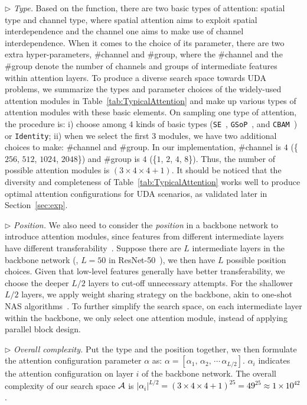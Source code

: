 \documentclass[10pt,twocolumn,letterpaper]{article}
\begin{document}
$\triangleright$ \textit{Type.}
Based on the function, there are two basic types of attention: spatial type and channel type, where spatial attention aims to exploit spatial interdependence and the channel one aims to make use of channel interdependence. When it comes to the choice of its parameter, there are two extra hyper-parameters, \#channel and \#group, where the \#channel and the \#group denote the number of channels and groups of intermediate features within attention layers. To produce a diverse search space towards UDA problems, we summarize the types and parameter choices of the widely-used attention modules in Table~\ref{tab:TypicalAttention} and make up various types of attention modules with these basic elements. On sampling one type of attention, the procedure is: i) choose among $4$ kinds of basic types (\texttt{SE}~\cite{hu2018SENet}, \texttt{GSoP}~\cite{gao2019GSoP}, and \texttt{CBAM}~\cite{woo2018cbam}) or \texttt{Identity}; ii) when we select the first $3$ modules, we have two additional choices to make: \#channel and \#group. In our implementation, \#channel is $4$ (\{$256$, $512$, $1024$, $2048$\}) and \#group is $4$ (\{$1$, $2$, $4$, $8$\}).
Thus, the number of possible attention modules is $(3 \times 4 \times 4 + 1)$.
It should be noticed that the diversity and completeness of Table~\ref{tab:TypicalAttention} works well to produce optimal attention configurations for UDA scenarios, as validated later in Section~\ref{sec:exp}.



$\triangleright$ \textit{Position.}
We also need to consider the \emph{position} in a backbone network to introduce attention modules, since features from different intermediate layers have different transferability~\cite{yosinski2014transferable}. Suppose there are $L$ intermediate layers in the backbone network (\eg, $L = 50$ in ResNet-50~\cite{he2016resnet}), we then have $L$ possible position choices.
Given that low-level features generally have better transferability, we choose the deeper $L / 2$ layers to cut-off unnecessary attempts. For the shallower $L / 2$ layers, we apply weight sharing strategy on the backbone, akin to one-shot NAS algorithms~\cite{bender2018oneshotNAS,guo2020SPOS}.
To further simplify the search space, on each intermediate layer within the backbone, we only select one attention module, instead of applying parallel block design.

$\triangleright$ \textit{Overall complexity.}
Put the type and the position together, we then formulate the attention configuration parameter $\alpha$ as: $\alpha = [ \alpha_{1}, \, \alpha_{2}, \, \cdots \, \alpha_{L/2} ]$. $\alpha_{i}$ indicates the attention configuration on layer $i$ of the backbone network. The overall complexity of our search space $\mathcal{A}$ is \textcolor{black}{$|\alpha_{i}|^{L/2} = (3 \times 4 \times 4 + 1)^{25} = 49^{25} \approx 1 \times 10^{42}$}.
\end{document}
